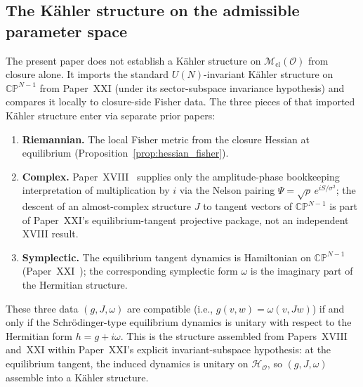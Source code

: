 \documentclass[12pt]{article}
\newcommand{\Ocal}{\mathcal{O}}
\newcommand{\Hcal}{\mathcal{H}}
\newcommand{\Mcl}{\mathcal{M}_{\mathrm{cl}}}
\begin{document}
\subsection{The K\"ahler structure on the admissible parameter space}\label{subsec:kahler}

The present paper does not establish a K\"ahler structure on $\Mcl(\Ocal)$ from closure alone. It imports the standard $U(N)$-invariant K\"ahler structure on $\mathbb{CP}^{N-1}$ from Paper~XXI (under its sector-subspace invariance hypothesis) and compares it locally to closure-side Fisher data. The three pieces of that imported K\"ahler structure enter via separate prior papers:

\begin{enumerate}
    \item \textbf{Riemannian.} The local Fisher metric from the closure Hessian at equilibrium (Proposition~\ref{prop:hessian_fisher}).
    \item \textbf{Complex.} Paper~XVIII~\citep{SmartXVIII} supplies only the amplitude-phase bookkeeping interpretation of multiplication by $i$ via the Nelson pairing $\Psi = \sqrt{\rho}\,e^{iS/\sigma^2}$; the descent of an almost-complex structure $J$ to tangent vectors of $\mathbb{CP}^{N-1}$ is part of Paper~XXI's equilibrium-tangent projective package, not an independent XVIII result.
    \item \textbf{Symplectic.} The equilibrium tangent dynamics is Hamiltonian on $\mathbb{CP}^{N-1}$ (Paper~XXI~\citep{SmartXXI}); the corresponding symplectic form $\omega$ is the imaginary part of the Hermitian structure.
\end{enumerate}

These three data $(g, J, \omega)$ are compatible (i.e., $g(v,w) = \omega(v, Jw)$) if and only if the Schr\"odinger-type equilibrium dynamics is unitary with respect to the Hermitian form $h = g + i\omega$. This is the structure assembled from Papers~XVIII and~XXI within Paper~XXI's explicit invariant-subspace hypothesis: at the equilibrium tangent, the induced dynamics is unitary on $\Hcal_\Ocal$, so $(g, J, \omega)$ assemble into a K\"ahler structure.
\end{document}

